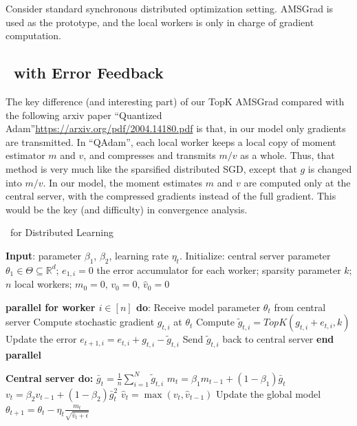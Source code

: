 \documentclass[11pt]{article}
\begin{document}
Consider standard synchronous distributed optimization setting. AMSGrad is used as the prototype, and the local workers is only in charge of gradient computation.


\subsection{\algo\ with Error Feedback}




The key difference (and interesting part) of our TopK AMSGrad compared with the following arxiv paper ``Quantized Adam''\url{https://arxiv.org/pdf/2004.14180.pdf} is that, in our model only gradients are transmitted. In ``QAdam'', each local worker keeps a local copy of moment estimator $m$ and $v$, and compresses and transmits $m/v$ as a whole. Thus, that method is very much like the sparsified distributed SGD, except that $g$ is changed into $m/v$. In our model, the moment estimates $m$ and $v$ are computed only at the central server, with the compressed gradients instead of the full gradient. This would be the key (and difficulty) in convergence analysis.


\begin{algorithm}[H]
\caption{\algo\ for Distributed Learning} \label{alg:sparsams}
\begin{algorithmic}[1]

\STATE \textbf{Input}: parameter $\beta_1$, $\beta_2$, learning rate $\eta_t$. 
\STATE Initialize: central server parameter $\theta_{1} \in \Theta \subseteq \mathbb R^d$; $e_{1,i}=0$ the error accumulator for each worker; sparsity parameter $k$; $n$ local workers; $m_0=0$, $v_0=0$, $\hat v_0=0$


\STATE\textbf{parallel for worker $i \in [n]$ do}:
\STATE\quad  Receive model parameter $\theta_{t}$ from central server
\STATE\quad  Compute stochastic gradient $g_{t,i}$ at $\theta_t$
\STATE\quad  Compute $\tilde g_{t,i}=TopK(g_{t,i}+e_{t,i},k)$ \label{line:topk} 
\STATE\quad  Update the error $e_{t+1,i}=e_{t,i}+g_{t,i}-\tilde g_{t,i}$
\STATE\quad  Send $\tilde g_{t,i}$ back to central server
\STATE \textbf{end parallel}

\STATE \textbf{Central server do:}
\STATE $\bar g_{t}=\frac{1}{n}\sum_{i=1}^N \tilde g_{t,i}$
\STATE $m_t=\beta_1 m_{t-1}+(1-\beta_1)\bar g_t$
\STATE $v_t=\beta_2 v_{t-1}+(1-\beta_2)\bar g_t^2$
\STATE $\hat v_t=\max(v_t,\hat v_{t-1})$ \label{line:v}
\STATE Update the global model $\theta_{t+1}=\theta_{t}-\eta_t\frac{m_t}{\sqrt{\hat v_t+\epsilon}}$

\ENDFOR
\end{algorithmic}
\end{algorithm}
\end{document}
